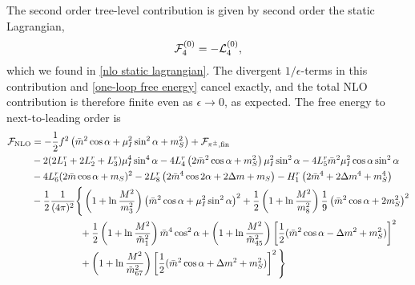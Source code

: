The second order tree-level contribution is given by second order the static Lagrangian,
%
\begin{equation}
    \mathcal{F}^{(0)}_4 = - \mathcal{L}_4^{(0)},
\end{equation}
%
which we found in \autoref{nlo static lagrangian}.
The divergent $1/\epsilon$-terms in this contribution and \autoref{one-loop free energy} cancel exactly, and the total NLO contribution is therefore finite even as $\epsilon\rightarrow 0$, as expected.
The free energy to next-to-leading order is 
%
\begin{align}
    \nonumber
    \mathcal{F}_{\text{NLO}}
    &=-\frac{1}{2} f^2 \left(\bar m^2 \cos\alpha + \mu_I^2 \sin^2\alpha + m_S^2\right)
    + \mathcal{F}_{{\pi^\pm},\text{fin}} \\ \nonumber
    &-2(2L_1^r + 2L_2^r + L_3^r) \mu_I^4 \sin^4\alpha
    - 4  L_4^r \left( 2 \bar m^2 \cos\alpha + m_S^2 \right) \mu_I^2\sin^2\alpha
    - 4 L_5^r \bar m^2 \mu_I^2 \cos\alpha \sin^2 \alpha 
    \\ \nonumber
    & 
    - 4 L_6^r (2\bar m\cos\alpha + m_S)^2
    - 2 L_8^r \left(2 \bar m^4 \cos2\alpha + 2 \Delta m + m_S\right)
    - H_1^r \left(2\bar m^4 + 2\Delta m^4 + m_S^4 \right) \\\nonumber
    & - \frac{1}{2} \frac{1}{(4 \pi)^2}  
    \Bigg\{
        \left(
            1 + \ln\frac{M^2}{m_3^2}
        \right)
        \left(\bar m^2 \cos\alpha + \mu_I^2\sin^2\alpha\right)^2
        + 
        \frac{1}{2}
        \left(
            1 + \ln\frac{M^2}{m_8^2} 
        \right)
        \frac{1}{9}\left(\bar m^2\cos\alpha+2m_S^2\right)^2
        \\ \nonumber
        & 
        \quad\quad\quad\quad\quad
        +
        \frac{1}{2}
        \left(
            1 + \ln\frac{M^2}{\tilde m_1^2}
        \right)
        \bar m^4\cos^2\alpha
        +
        \left(
            1 + \ln\frac{M^2}{\tilde m_{45}^2}
        \right)
        \left[\frac{1}{2}(\bar m^2 \cos \alpha - \Delta m^2 + m_S^2)\right]^2
        \\
        & 
        \quad\quad\quad\quad\quad
        +
        \left(
            1 + \ln\frac{M^2}{\tilde m_{67}^2} 
        \right)
        \left[\frac{1}{2}(\bar m^2 \cos \alpha + \Delta m^2 + m_S^2)\right]^2
    \Bigg\}
\end{align}
%
